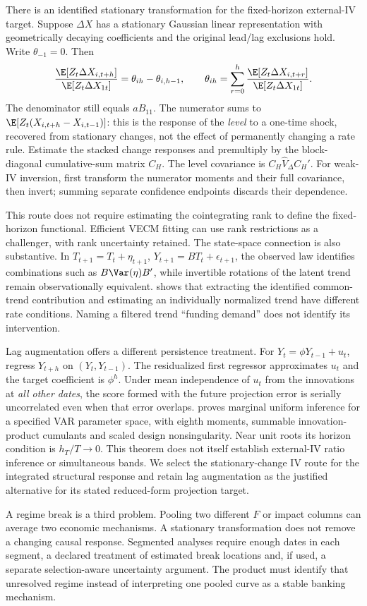 There is an identified stationary transformation for the fixed-horizon
external-IV target. Suppose $\Delta X$ has a stationary Gaussian linear
representation with geometrically decaying coefficients and the original
lead/lag exclusions hold. Write $\theta_{-1}=0$. Then
\[
 \frac{\E[Z_t\Delta X_{i,t+h}]}{\E[Z_t\Delta X_{1t}]}
       =\theta_{ih}-\theta_{i,h-1},\qquad
 \theta_{ih}=\sum_{r=0}^h
       \frac{\E[Z_t\Delta X_{i,t+r}]}{\E[Z_t\Delta X_{1t}]}.
\]
The denominator still equals $aB_{11}$. The numerator sums to
$\E[Z_t(X_{i,t+h}-X_{i,t-1})]$: this is the response of the
\emph{level} to a one-time shock, recovered from stationary changes,
not the effect of permanently changing a rate rule. Estimate the stacked
change responses and premultiply by the block-diagonal cumulative-sum
matrix $C_H$. The level covariance is
$C_H\widehat V_\Delta C_H'$. For weak-IV inversion, first transform
the numerator moments and their full covariance, then invert; summing
separate confidence endpoints discards their dependence.

This route does not require estimating the cointegrating rank to define
the fixed-horizon functional. Efficient VECM fitting can use rank
restrictions as a challenger, with rank uncertainty retained. The state-space
connection is also substantive. In $T_{t+1}=T_t+\eta_{t+1}$,
$Y_{t+1}=BT_t+\epsilon_{t+1}$, the observed law identifies combinations
such as $B\Var(\eta)B'$, while invertible rotations of the latent trend
remain observationally equivalent. \citet[Theorems 1--2]{johansen2017}
shows that extracting the identified common-trend contribution and
estimating an individually normalized trend have different rate conditions.
Naming a filtered trend ``funding demand'' does not identify its intervention.

Lag augmentation offers a different persistence treatment. For
$Y_t=\phi Y_{t-1}+u_t$, regress $Y_{t+h}$ on $(Y_t,Y_{t-1})$.
The residualized first regressor approximates $u_t$ and the target
coefficient is $\phi^h$. Under mean independence of $u_t$ from the
innovations at \emph{all other dates}, the score formed with the
future projection error is serially uncorrelated even when that error
overlaps. \citet[Definition 1, Assumptions 1--3, Proposition 1]{lpaug2020}
proves marginal uniform inference for a specified VAR parameter space,
with eighth moments, summable innovation-product cumulants and scaled
design nonsingularity. Near unit roots its horizon condition is
$h_T/T\to0$. This theorem does not itself establish external-IV ratio
inference or simultaneous bands. We select the stationary-change IV route
for the integrated structural response and retain lag augmentation as
the justified alternative for its stated reduced-form projection target.

A regime break is a third problem. Pooling two different $F$ or impact
columns can average two economic mechanisms. A stationary transformation
does not remove a changing causal response. Segmented analyses require
enough dates in each segment, a declared treatment of estimated break
locations and, if used, a separate selection-aware uncertainty argument.
The product must identify that unresolved regime instead of interpreting
one pooled curve as a stable banking mechanism.

